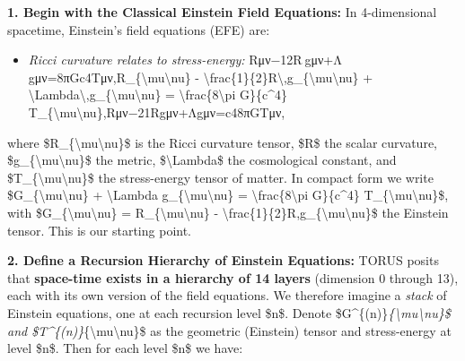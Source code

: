 \documentclass[
]{article}
\begin{document}
\textbf{1. Begin with the Classical Einstein Field Equations:} In
4-dimensional spacetime, Einstein's field equations (EFE) are:

\begin{itemize}
\item
  \emph{Ricci curvature relates to stress-energy:}
  Rμν−12R gμν+Λ gμν=8πGc4Tμν,R\_\{\textbackslash mu\textbackslash nu\} -
  \textbackslash frac\{1\}\{2\}R\textbackslash,g\_\{\textbackslash mu\textbackslash nu\}
  +
  \textbackslash Lambda\textbackslash,g\_\{\textbackslash mu\textbackslash nu\}
  = \textbackslash frac\{8\textbackslash pi G\}\{c\^{}4\}
  T\_\{\textbackslash mu\textbackslash nu\},Rμν\hspace{0pt}−21\hspace{0pt}Rgμν\hspace{0pt}+Λgμν\hspace{0pt}=c48πG\hspace{0pt}Tμν\hspace{0pt},
\end{itemize}

where \$R\_\{\textbackslash mu\textbackslash nu\}\$ is the Ricci
curvature tensor, \$R\$ the scalar curvature,
\$g\_\{\textbackslash mu\textbackslash nu\}\$ the metric,
\$\textbackslash Lambda\$ the cosmological constant, and
\$T\_\{\textbackslash mu\textbackslash nu\}\$ the stress-energy tensor
of matter. In compact form we write
\$G\_\{\textbackslash mu\textbackslash nu\} + \textbackslash Lambda
g\_\{\textbackslash mu\textbackslash nu\} =
\textbackslash frac\{8\textbackslash pi G\}\{c\^{}4\}
T\_\{\textbackslash mu\textbackslash nu\}\$, with
\$G\_\{\textbackslash mu\textbackslash nu\} =
R\_\{\textbackslash mu\textbackslash nu\} -
\textbackslash frac\{1\}\{2\}R,g\_\{\textbackslash mu\textbackslash nu\}\$
the Einstein tensor. This is our starting point\hspace{0pt}.

\textbf{2. Define a Recursion Hierarchy of Einstein Equations:} TORUS
posits that \textbf{space-time exists in a hierarchy of 14 layers}
(dimension 0 through 13), each with its own version of the field
equations\hspace{0pt}. We therefore imagine a \emph{stack} of Einstein
equations, one at each recursion level \$n\$. Denote
\$G\^{}\{(n)\}\emph{\{\textbackslash mu\textbackslash nu\}\$ and
\$T\^{}\{(n)\}}\{\textbackslash mu\textbackslash nu\}\$ as the geometric
(Einstein) tensor and stress-energy at level \$n\$. Then for each level
\$n\$ we have:
\end{document}
